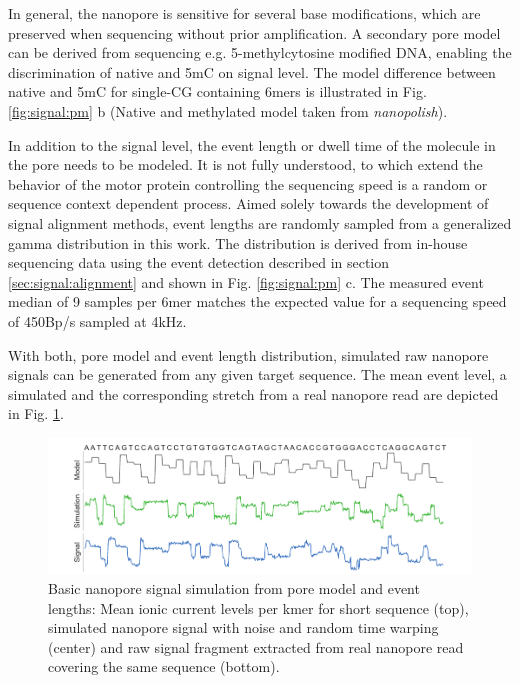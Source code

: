 In general, the nanopore is sensitive for several base modifications, which are preserved when sequencing without prior amplification. A secondary pore model can be derived from sequencing e.g. 5-methylcytosine modified DNA, enabling the discrimination of native and 5mC on signal level. The model difference between native and 5mC for single-CG containing 6mers is illustrated in Fig. \ref{fig:signal:pm} b (Native and methylated model taken from \textit{nanopolish}).

In addition to the signal level, the event length or dwell time of the molecule in the pore needs to be modeled. It is not fully understood, to which extend the behavior of the motor protein controlling the sequencing speed is a random or sequence context dependent process. Aimed solely towards the development of signal alignment methods, event lengths are randomly sampled from a generalized gamma distribution in this work. 
The distribution is derived from in-house sequencing data using the event detection described in section \ref{sec:signal:alignment} and shown in Fig. \ref{fig:signal:pm} c. The measured event median of 9 samples per 6mer matches the expected value for a sequencing speed of 450Bp/s sampled at 4kHz.

With both, pore model and event length distribution, simulated raw nanopore signals can be generated from any given target sequence. The mean event level, a simulated and the corresponding stretch from a real nanopore read are depicted in Fig. \ref{fig:signal:simulation}.

\begin{figure}[h]
	\centering
	\includegraphics[width=1.0\textwidth]{figures/signal/simulation.pdf}
	\captionsetup{format=plain}
	\caption[Basic signal simulation]{Basic nanopore signal simulation from pore model and event lengths: Mean ionic current levels per kmer for short sequence (top), simulated nanopore signal with noise and random time warping (center) and raw signal fragment extracted from real nanopore read covering the same sequence (bottom).}
	\label{fig:signal:simulation}
\end{figure}

